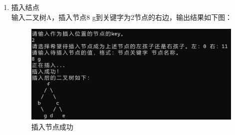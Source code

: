 \documentclass[supercite]{Experimental_Report}
\theoremstyle{definition}
\begin{document}
\begin{enumerate}
	\item 插入结点\\
	输入二叉树A，插入节点8 g到关键字为2节点的右边，输出结果如下图：
		\begin{figure}[H]
		\centering
		\includegraphics[width=1\linewidth]{images/插入节点成功.png}
		\caption{插入节点成功}
		\label{fig2-18}
	\end{figure}
	

\end{enumerate}
\end{document}
